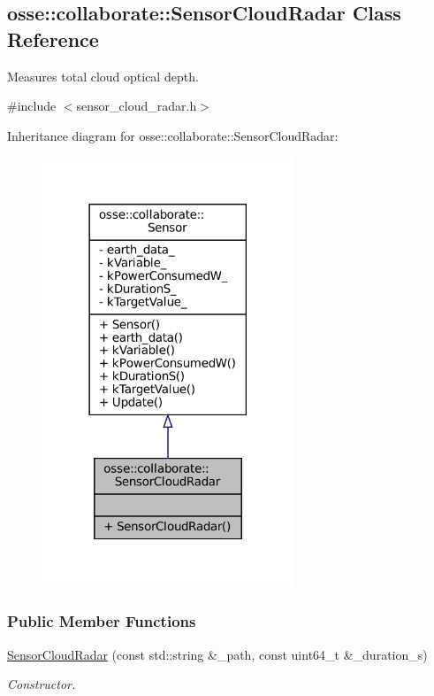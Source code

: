 \hypertarget{classosse_1_1collaborate_1_1_sensor_cloud_radar}{}\subsection{osse\+:\+:collaborate\+:\+:Sensor\+Cloud\+Radar Class Reference}
\label{classosse_1_1collaborate_1_1_sensor_cloud_radar}


Measures total cloud optical depth.  




{\ttfamily \#include $<$sensor\+\_\+cloud\+\_\+radar.\+h$>$}



Inheritance diagram for osse\+:\+:collaborate\+:\+:Sensor\+Cloud\+Radar\+:
\nopagebreak
\begin{figure}[H]
\begin{center}
\leavevmode
\includegraphics[width=213pt]{classosse_1_1collaborate_1_1_sensor_cloud_radar__inherit__graph}
\end{center}
\end{figure}
\subsubsection*{Public Member Functions}
\begin{DoxyCompactItemize}
\item 
\hyperlink{classosse_1_1collaborate_1_1_sensor_cloud_radar_aa23eab08fd54a881f9a85f1b35616386}{Sensor\+Cloud\+Radar} (const std\+::string \&\+\_\+path, const uint64\+\_\+t \&\+\_\+duration\+\_\+s)
\begin{DoxyCompactList}\small\item\em Constructor. \end{DoxyCompactList}\end{DoxyCompactItemize}


